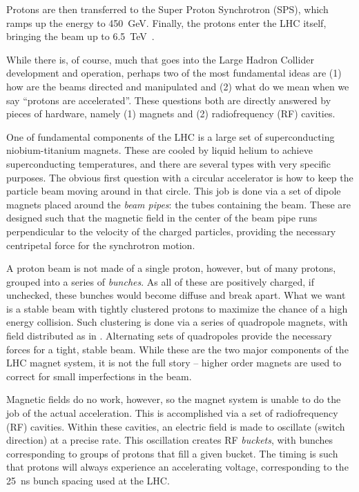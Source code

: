 Protons are then transferred to the Super Proton Synchrotron (SPS), which ramps up the energy to 
\SI{450}{\GeV}. Finally, the protons enter the LHC itself, bringing the beam up to \SI{6.5}{\TeV}~\cite{accelerator}.

While there is, of course, much that goes into the Large Hadron Collider development and operation, perhaps
two of the most fundamental ideas are (1) how are the beams directed and manipulated and (2) what do we 
mean when we say ``protons are accelerated''. These questions both are directly answered by pieces of hardware,
namely (1) magnets and (2) radiofrequency (RF) cavities.

One of fundamental components of the LHC is a large set of superconducting niobium-titanium magnets. These 
are cooled by liquid helium to achieve superconducting temperatures, and there are several types with very 
specific purposes. The obvious first question with a circular accelerator is how to keep the particle beam 
moving around in that circle. This job is done via a set of dipole magnets placed around the \emph{beam pipes}: the 
tubes containing the beam. These are designed such that the magnetic field in the center of the beam pipe runs 
perpendicular to the velocity of the charged particles, providing the necessary centripetal force for 
the synchrotron motion.

A proton beam is not made of a single proton, however, but of many protons, grouped into a series of \emph{bunches}.
As all of these are positively charged, if unchecked, these bunches would become diffuse and break apart. What we 
want is a stable beam with tightly clustered protons to maximize the chance of a high energy collision.
Such clustering is done via a series of quadropole magnets, with field distributed as in 
. Alternating sets of quadropoles provide the necessary forces for a tight, 
stable beam. While these are the two major components of the LHC magnet system, it is not the full story -- higher order 
magnets are used to correct for small imperfections in the beam.

Magnetic fields do no work, however, so the magnet system is unable to do the job of the actual acceleration. This is 
accomplished via a set of radiofrequency (RF) cavities. Within these cavities, an electric field is made to 
oscillate (switch direction) at a precise rate. This oscillation creates RF \emph{buckets}, with 
bunches corresponding to groups of protons that fill a given bucket. The timing is such that protons will always 
experience an accelerating voltage, corresponding to the \SI{25}{\ns} bunch spacing used at the LHC.

